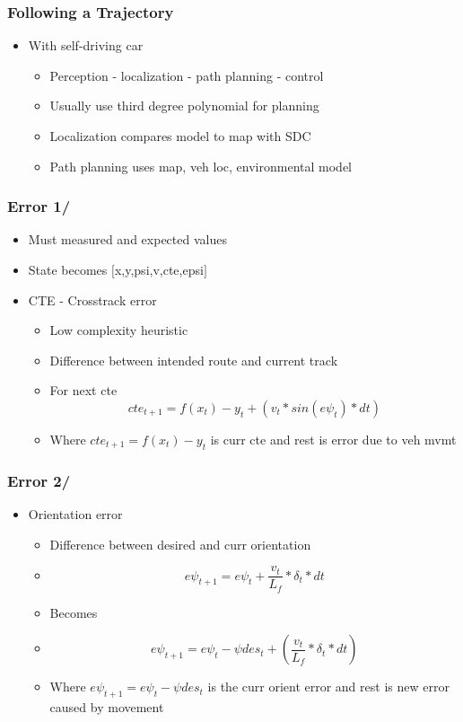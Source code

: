 \documentclass[11pt,xcolor={dvipsnames},usepdftitle=false]{beamer}
\begin{document}
\begin{frame}
  \frametitle{Following a Trajectory}
  \begin{itemize}
    \small\item With self-driving car
      \begin{itemize}
        \small\item Perception - localization - path planning - control
        \small\item Usually use third degree polynomial for planning
        \small\item Localization compares model to map with SDC
        \small\item Path planning uses map, veh loc, environmental model
      \end{itemize}
  \end{itemize}

\end{frame}

\begin{frame}
  \frametitle{Error 1/}
  \begin{itemize}
    \small\item Must measured and expected values
    \small\item State becomes $[$x,y,psi,v,cte,epsi$]$
    \small\item CTE - Crosstrack error
      \begin{itemize}
        \small\item Low complexity heuristic
        \small\item Difference between intended route and current track
        \small\item For next cte $$cte_{t+1} = f(x_t) - y_t +  (v_t * sin(e\psi_t)*dt) $$
        \small\item Where $cte_{t+1} = f(x_t) - y_t$ is curr cte and rest is error due to veh mvmt
      \end{itemize}
  \end{itemize}

\end{frame}

\begin{frame}
  \frametitle{Error 2/}
  \begin{itemize}
    \small\item Orientation error
      \begin{itemize}
        \small\item Difference between desired and curr orientation
        \small\item $$e\psi_{t+1} = e\psi_t + \frac{v_t}{L_f}*\delta_t*dt$$
        \small\item Becomes
        \small\item $$e\psi_{t+1} = e\psi_t - \psi des_t + (\frac{v_t}{L_f}*\delta_t*dt)$$
        \small\item Where $e\psi_{t+1} = e\psi_t - \psi des_t$ is the curr orient error and rest is new error caused by movement
      \end{itemize}
  \end{itemize}

\end{frame}
\end{document}
